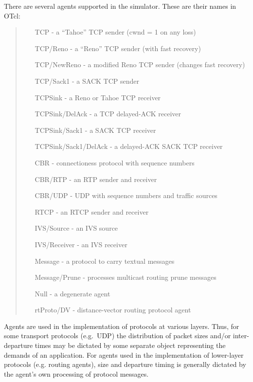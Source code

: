 There are several agents supported in the simulator.
These are their names in OTcl:
\begin{quote}
\begin{itemize}
        \item[TCP] - a ``Tahoe'' TCP sender (cwnd = 1 on any loss)
        \item[TCP/Reno] - a ``Reno'' TCP sender  (with fast recovery)
        \item[TCP/NewReno] - a modified Reno TCP sender (changes fast recovery)
        \item[TCP/Sack1] - a SACK TCP sender
        \item[TCPSink] - a Reno or Tahoe TCP receiver
        \item[TCPSink/DelAck] - a TCP delayed-ACK receiver
        \item[TCPSink/Sack1] - a SACK TCP receiver
	\item[TCPSink/Sack1/DelAck] - a delayed-ACK SACK TCP receiver

        \item[CBR] - connectioness protocol with sequence numbers
        \item[CBR/RTP] - an RTP sender and receiver
	\item[CBR/UDP] - UDP with sequence numbers and traffic sources
        \item[RTCP] - an RTCP sender and receiver

	\item[IVS/Source] - an IVS source
	\item[IVS/Receiver] - an IVS receiver

	\item[Message] - a protocol to carry textual messages
	\item[Message/Prune] - processes multicast routing prune messages

	\item[Null] - a degenerate agent

	\item[rtProto/DV] - distance-vector routing protocol agent
\end{itemize}
\end{quote}
Agents are used in the implementation of protocols at various layers.
Thus, for some transport protocols (e.g.~UDP) the distribution
of packet sizes and/or inter-departure times
may be dictated by some separate
object representing the demands of an application.
For agents used in the implementation of lower-layer protocols
(e.g. routing agents), size and departure timing is generally dictated
by the agent's own processing of protocol messages.

